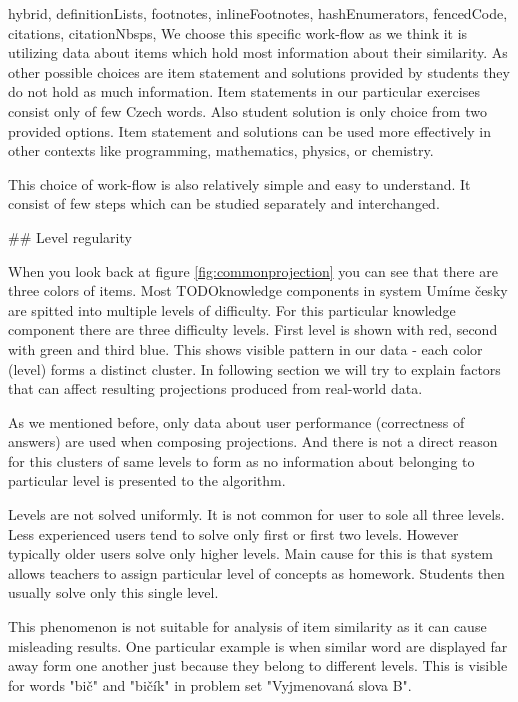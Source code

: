\documentclass[
  digital, %
  table,   %
  nolof,     %
  nolot,     %
  nocover
]{fithesis3}
\begin{document}
\begin{markdown*}{%
  hybrid,
  definitionLists,
  footnotes,
  inlineFootnotes,
  hashEnumerators,
  fencedCode,
  citations,
  citationNbsps,
}
We choose this specific work-flow as we think it is utilizing data about items which hold most information about their similarity. As other possible choices are item statement and solutions provided by students they do not hold as much information. Item statements in our particular exercises consist only of few Czech words. Also student solution is only choice from two provided options. Item statement and solutions can be used more effectively in other contexts like programming, mathematics, physics, or chemistry.

This choice of work-flow is also relatively simple and easy to understand. It consist of few steps which can be studied separately and interchanged.


## Level regularity

When you look back at figure \ref{fig:commonprojection} you can see that there are three colors of items. Most TODOknowledge components in system Umíme česky are spitted into multiple levels of difficulty. For this particular knowledge component there are three difficulty levels. First level is shown with red, second with green and third blue. This shows visible pattern in our data - each color (level) forms a distinct cluster.  In following section we will try to explain factors that can affect resulting projections produced from real-world data.

As we mentioned before, only data about user performance (correctness of answers) are used when composing projections. And there is not a direct reason for this clusters of same levels to form as no information about belonging to particular level is presented to the algorithm.


Levels are not solved uniformly. It is not common for user to sole all three levels. Less experienced users tend to solve only first or first two levels. However typically older users solve only higher levels. Main cause for this is that system allows teachers to assign particular level of concepts as homework. Students then usually solve only this single level.



This phenomenon is not suitable for analysis of item similarity as it can cause misleading results. One particular example is when similar word are displayed far away form one another just because they belong to different levels. This is visible for words "bič" and "bičík" in problem set "Vyjmenovaná slova B".


\end{markdown*}
\end{document}
